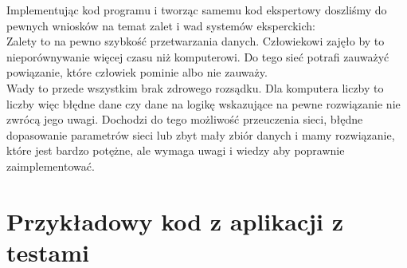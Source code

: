 \documentclass[12pt,a4paper]{article}
\begin{document}
	
	
	
	Implementując kod programu i tworząc samemu kod ekspertowy doszliśmy do pewnych wniosków na temat zalet i wad systemów eksperckich:\\
	Zalety to na pewno szybkość przetwarzania danych. Człowiekowi zajęło by to nieporównywanie więcej czasu niż komputerowi. Do tego sieć potrafi zauważyć powiązanie, które człowiek pominie albo nie zauważy.\\
	Wady to przede wszystkim brak zdrowego rozsądku. Dla komputera liczby to liczby więc błędne dane czy dane na logikę wskazujące na pewne rozwiązanie nie zwrócą jego uwagi. Dochodzi do tego możliwość przeuczenia sieci, błędne dopasowanie parametrów sieci lub zbyt mały zbiór danych i mamy rozwiązanie, które jest bardzo potężne, ale wymaga uwagi i wiedzy aby poprawnie zaimplementować.
	
	

\section*{Przykładowy kod z aplikacji z testami}
\end{document}
